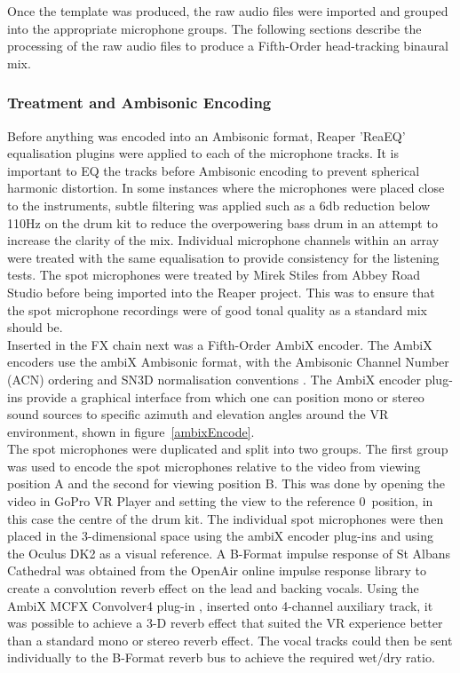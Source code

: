 				Once the template was produced, the raw audio files were imported and grouped into the appropriate microphone groups. The following sections describe the processing of the raw audio files to produce a Fifth-Order head-tracking binaural mix. \\

			\subsubsection{Treatment and Ambisonic Encoding}
				Before anything was encoded into an Ambisonic format, Reaper 'ReaEQ' equalisation plugins were applied to each of the microphone tracks. It is important to EQ the tracks before Ambisonic encoding to prevent spherical harmonic distortion. In some instances where the microphones were placed close to the instruments, subtle filtering was applied such as a 6db reduction below 110Hz on the drum kit to reduce the overpowering bass drum in an attempt to increase the clarity of the mix. Individual microphone channels within an array were treated with the same equalisation to provide consistency for the listening tests. The spot microphones were treated by Mirek Stiles from Abbey Road Studio before being imported into the Reaper project. This was to ensure that the spot microphone recordings were of good tonal quality as a standard mix should be. \\

				Inserted in the FX chain next was a Fifth-Order AmbiX encoder. The AmbiX encoders use the ambiX Ambisonic format, with the Ambisonic Channel Number (ACN) ordering and SN3D normalisation conventions \cite{AmbixFORMAT}. The AmbiX encoder plug-ins provide a graphical interface from which one can position mono or stereo sound sources to specific azimuth and elevation angles around the VR environment, shown in figure~\ref{ambixEncode}.\\

				The spot microphones were duplicated and split into two groups. The first group was used to encode the spot microphones relative to the video from viewing position A and the second for viewing position B. This was done by opening the video in GoPro VR Player and setting the view to the reference 0\textdegree~position, in this case the centre of the drum kit. The individual spot microphones were then placed in the 3-dimensional space using the ambiX encoder plug-ins and using the Oculus DK2 as a visual reference. A B-Format impulse response of St Albans Cathedral \cite{OpenAir} was obtained from the OpenAir online impulse response library to create a convolution reverb effect on the lead and backing vocals. Using the AmbiX MCFX Convolver4 plug-in \cite{AmbixPLUGINS}, \cite{AmbixDOWNLOAD} inserted onto 4-channel auxiliary track, it was possible to achieve a 3-D reverb effect that suited the VR experience better than a standard mono or stereo reverb effect. The vocal tracks could then be sent individually to the B-Format reverb bus to achieve the required wet/dry ratio.

